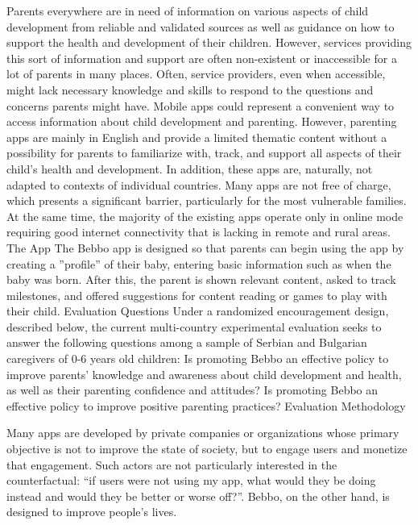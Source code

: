 \documentclass{article}
\begin{document}
Parents everywhere are in need of information on various aspects of child development from reliable and validated sources as well as guidance on how to support the health and development of their children. However, services providing this sort of information and support are often non-existent or inaccessible for a lot of parents in many places. Often, service providers, even when accessible, might lack necessary knowledge and skills to respond to the questions and concerns parents might have.
Mobile apps could represent a convenient way  to access information about child development and parenting. However, parenting apps are mainly in English and provide a limited thematic content without a possibility for parents to familiarize with, track, and support all aspects of their child’s health and development. In addition, these apps are, naturally, not adapted to contexts of individual countries. Many apps are not free of charge, which presents a significant barrier, particularly for the most vulnerable families. At the same time, the majority of the existing apps operate only in online mode requiring good internet connectivity that is lacking in remote and rural areas.
The App
The Bebbo app is designed so that parents can begin using the app by creating a ”profile” of their baby, entering basic information such as when the baby was born. After this, the parent is shown relevant content, asked to track milestones, and offered suggestions for content reading or games to play with their child.
Evaluation Questions
Under a randomized encouragement design, described below, the current multi-country experimental evaluation seeks to answer the following questions among a sample of Serbian and Bulgarian caregivers of 0-6 years old children:
Is promoting Bebbo an effective policy to improve parents’ knowledge and awareness about child development and health, as well as their parenting confidence and attitudes?
Is promoting Bebbo an effective policy to  improve positive parenting practices?
Evaluation Methodology

Many apps are developed by private companies or organizations whose primary objective is not to improve the state of society, but to engage users and monetize that engagement. Such actors are not particularly interested in the counterfactual: “if users were not using my app, what would they be doing instead and would they be better or worse off?”. Bebbo, on the other hand, is designed to improve people’s lives.
\end{document}
